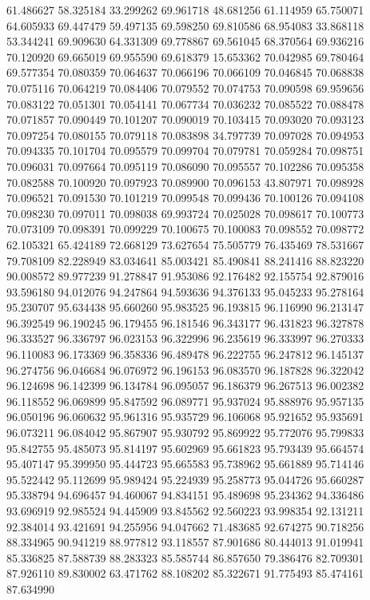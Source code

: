 61.486627
58.325184
33.299262
69.961718
48.681256
61.114959
65.750071
64.605933
69.447479
59.497135
69.598250
69.810586
68.954083
33.868118
53.344241
69.909630
64.331309
69.778867
69.561045
68.370564
69.936216
70.120920
69.665019
69.955590
69.618379
15.653362
70.042985
69.780464
69.577354
70.080359
70.064637
70.066196
70.066109
70.046845
70.068838
70.075116
70.064219
70.084406
70.079552
70.074753
70.090598
69.959656
70.083122
70.051301
70.054141
70.067734
70.036232
70.085522
70.088478
70.071857
70.090449
70.101207
70.090019
70.103415
70.093020
70.093123
70.097254
70.080155
70.079118
70.083898
34.797739
70.097028
70.094953
70.094335
70.101704
70.095579
70.099704
70.079781
70.059284
70.098751
70.096031
70.097664
70.095119
70.086090
70.095557
70.102286
70.095358
70.082588
70.100920
70.097923
70.089900
70.096153
43.807971
70.098928
70.096521
70.091530
70.101219
70.099548
70.099436
70.100126
70.094108
70.098230
70.097011
70.098038
69.993724
70.025028
70.098617
70.100773
70.073109
70.098391
70.099229
70.100675
70.100083
70.098552
70.098772
62.105321
65.424189
72.668129
73.627654
75.505779
76.435469
78.531667
79.708109
82.228949
83.034641
85.003421
85.490841
88.241416
88.823220
90.008572
89.977239
91.278847
91.953086
92.176482
92.155754
92.879016
93.596180
94.012076
94.247864
94.593636
94.376133
95.045233
95.278164
95.230707
95.634438
95.660260
95.983525
96.193815
96.116990
96.213147
96.392549
96.190245
96.179455
96.181546
96.343177
96.431823
96.327878
96.333527
96.336797
96.023153
96.322996
96.235619
96.333997
96.270333
96.110083
96.173369
96.358336
96.489478
96.222755
96.247812
96.145137
96.274756
96.046684
96.076972
96.196153
96.083570
96.187828
96.322042
96.124698
96.142399
96.134784
96.095057
96.186379
96.267513
96.002382
96.118552
96.069899
95.847592
96.089771
95.937024
95.888976
95.957135
96.050196
96.060632
95.961316
95.935729
96.106068
95.921652
95.935691
96.073211
96.084042
95.867907
95.930792
95.869922
95.772076
95.799833
95.842755
95.485073
95.814197
95.602969
95.661823
95.793439
95.664574
95.407147
95.399950
95.444723
95.665583
95.738962
95.661889
95.714146
95.522442
95.112699
95.989424
95.224939
95.258773
95.044726
95.660287
95.338794
94.696457
94.460067
94.834151
95.489698
95.234362
94.336486
93.696919
92.985524
94.445909
93.845562
92.560223
93.998354
92.131211
92.384014
93.421691
94.255956
94.047662
71.483685
92.674275
90.718256
88.334965
90.941219
88.977812
93.118557
87.901686
80.444013
91.019941
85.336825
87.588739
88.283323
85.585744
86.857650
79.386476
82.709301
87.926110
89.830002
63.471762
88.108202
85.322671
91.775493
85.474161
87.634990
